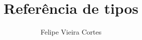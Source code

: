 \documentclass[phd,american,digital]{thesispuc}%
\author{Felipe Vieira Cortes}
\title{Referência de tipos} %
\begin{document}
  
  
  
  \arial
   
\end{document}
